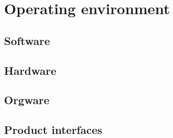 \section{Operating environment}

\subsection{Software}

\subsection{Hardware}

\subsection{Orgware}

\subsection{Product interfaces}